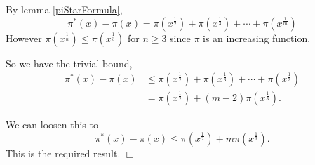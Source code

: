 \documentclass[10pt]{article}
\newenvironment{proof}[1][Proof]{\begin{trivlist}
\item[\hskip \labelsep {\bfseries #1}]}{\end{trivlist}}
\begin{document}
\begin{proof}
    By lemma \ref{piStarFormula}, 
    \begin{equation*}
        \pi^*(x)-\pi(x) = \pi(x^\frac{1}{2})+\pi(x^{\frac{1}{3}})+\cdots+\pi(x^\frac{1}{m})
    \end{equation*}
    However $\pi(x^\frac{1}{n}) \leq \pi(x^\frac{1}{3})$ for $n\geq 3$
    since $\pi$ is an increasing function.
    
    So we have 
    the trivial bound,
    \begin{align*}
        \pi^*(x)-\pi(x) &\leq \pi(x^\frac{1}{2})+\pi(x^\frac{1}{3})+\cdots+\pi(x^\frac{1}{3})   \\
        &= \pi(x^\frac{1}{2})+(m-2)\pi(x^\frac{1}{3}).
    \end{align*}
    
    
    We can loosen this to
    \begin{equation*}
        \pi^*(x)-\pi(x) \leq \pi(x^\frac{1}{2})+m\pi(x^\frac{1}{3}).
    \end{equation*}
    This is the required result. $\Box$
\end{proof}
\end{document}
